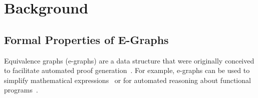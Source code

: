 \section{Background}\label{sec:background}


\subsection{Formal Properties of E-Graphs}\label{sec:background:egraph}
Equivalence graphs (e-graphs) are a data structure that were originally
conceived to facilitate automated proof generation~\cite{eggpaper, eqsat}. For
example, e-graphs can be used to simplify mathematical
expressions~\cite{egraphmath} or for automated reasoning about functional
programs~\cite{cclemma}.